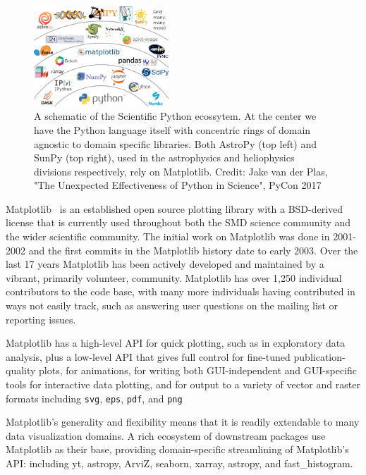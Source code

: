 \documentclass[12pt]{article}
\numberwithin{page}{section}
\begin{document}
\begin{figure}
  \includegraphics[width=0.45\textwidth]{scipy-ecosystem}
  \caption{A schematic of the Scientific Python ecossytem.  At the
    center we have the Python language itself with concentric rings of
    domain agnostic to domain specific libraries.  Both AstroPy (top
    left) and SunPy (top right), used in the astrophysics and
    heliophysics divisions respectively, rely on Matplotlib.
    Credit: Jake van der Plas, "The Unexpected Effectiveness of Python
    in Science", PyCon 2017}
  \label{fig:ecosystem}
\end{figure}



Matplotlib~\cite{Hunter:2007} is an established open source plotting
library with a BSD-derived license that is currently used throughout
both the SMD science community and the wider scientific community.
The initial work on Matplotlib was done in 2001-2002 and the first
commits in the Matplotlib history date to early 2003.  Over the last
17 years Matplotlib has been actively developed and maintained by a
vibrant, primarily volunteer, community.  Matplotlib has over 1,250
individual contributors to the code base, with many more
individuals having contributed in ways not easily track, such as
answering user questions on the mailing list or reporting issues.

Matplotlib has a high-level API for quick plotting, such as in
exploratory data analysis, plus a low-level API that gives full control for
fine-tuned publication-quality plots, for animations, for writing both
GUI-independent and GUI-specific tools for interactive data plotting, and
for output to a variety of vector and raster
formats including \texttt{svg}, \texttt{eps},
\texttt{pdf}, and \texttt{png}

Matplotlib's generality and flexibility means that it is readily extendable to
many data visualization domains.  A rich ecosystem of downstream packages use
Matplotlib as their base, providing domain-specific streamlining of
Matplotlib's API: including yt, astropy, ArviZ, seaborn, xarray, astropy, and
fast\_histogram.
\end{document}
